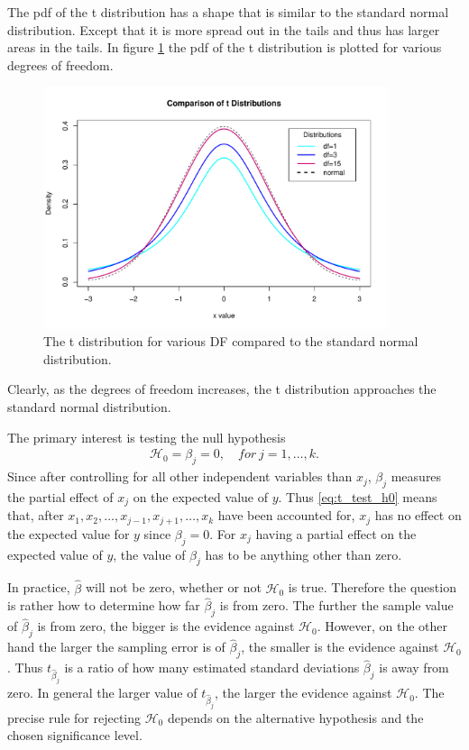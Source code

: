 The pdf of the t distribution has a shape that is similar to the standard normal distribution. Except that it is more spread out in the tails and thus has larger areas in the tails. In figure \ref{fig:t_distribution} the pdf of the t distribution is plotted for various degrees of freedom. 

\begin{figure}[h]
    \centering
    \includegraphics[width = 0.9\textwidth]{figures/t_distribution.pdf}
    \caption{The t distribution for various DF compared to the standard normal distribution.}
    \label{fig:t_distribution}
\end{figure}

Clearly, as the degrees of freedom increases, the t distribution approaches the standard normal distribution.

The primary interest is testing the null hypothesis
\begin{align} \label{eq:t_test_h0}
    \mathcal{H}_0=\beta_j=0, \quad for \ j=1,\ldots,k.
\end{align}
Since after controlling for all other independent variables than $x_j$, $\beta_j$ measures the partial effect of $x_j$ on the expected value of $y$. 
Thus \eqref{eq:t_test_h0} means that, after $x_1,x_2, \ldots, x_{j-1}, x_{j+1}, \ldots, x_k$ have been accounted for, $x_j$ has no effect on the expected value for $y$ since $\beta_j=0$. 
For $x_j$ having a partial effect on the expected value of $y$, the value of $\beta_j$ has to be anything other than zero.

In practice, $\hat{\beta}$ will not be zero, whether or not $\mathcal{H}_0$ is true. Therefore the question is rather how to determine how far $\hat{\beta}_j$ is from zero. The further the sample value of $\hat{\beta}_j$ is from zero, the bigger is the evidence against $\mathcal{H}_0$. However, on the other hand the larger the sampling error is of $\hat{\beta}_j$, the smaller is the evidence against $\mathcal{H}_0$. Thus $t_{\hat{\beta}_j}$ is a ratio of how many estimated standard deviations $\hat{\beta}_j$ is away from zero. In general the larger value of $t_{\hat{\beta}_j}$, the larger the evidence against $\mathcal{H}_0$. The precise rule for rejecting $\mathcal{H}_0$ depends on the alternative hypothesis and the chosen significance level.

